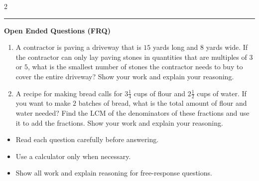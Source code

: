 \documentclass[10pt]{article}
\begin{document}
\begin{multicols}{2}
\begin{enumerate}[label=\textbf{Q\arabic*.}, leftmargin=*, itemsep=6pt, parsep=0pt]
\end{enumerate}
\end{multicols}

\vspace{-0.2cm}
\hrule
\vspace{0.2cm}
\textbf{\small Open Ended Questions (FRQ)}
\begin{enumerate}[label=\textbf{Q\arabic*.}, start=9, itemsep=5pt, topsep=0pt]

  \item \small A contractor is paving a driveway that is $15$ yards long and $8$ yards wide. If the contractor can only lay paving stones in quantities that are multiples of $3$ or $5$, what is the smallest number of stones the contractor needs to buy to cover the entire driveway? Show your work and explain your reasoning. \vspace{2cm}

  \item \small A recipe for making bread calls for $3 \frac{1}{4}$ cups of flour and $2 \frac{1}{2}$ cups of water. If you want to make $2$ batches of bread, what is the total amount of flour and water needed? Find the LCM of the denominators of these fractions and use it to add the fractions. Show your work and explain your reasoning. \vspace{2cm}

\end{enumerate}

\vfill

\begin{tcolorbox}[colback=blue!5, colframe=mainblue!50, title=\small \textbf{Chef's Tips}, fonttitle=\bfseries, bottom=1mm]
\begin{itemize}[noitemsep, topsep=2pt, leftmargin=0.5cm]
  \item \scriptsize Read each question carefully before answering.\item \scriptsize Use a calculator only when necessary.\item \scriptsize Show all work and explain reasoning for free-response questions.
\end{itemize}
\end{tcolorbox}
\end{document}
